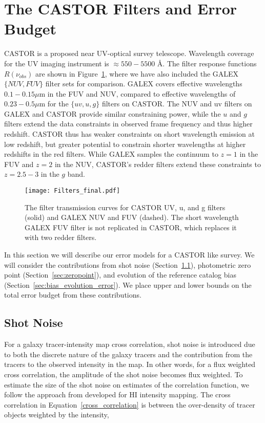 \documentclass[fleqn,usenatbib]{mnras}
\begin{document}
\section{The CASTOR Filters and Error Budget}
\label{sec:error}

{\small CASTOR} is a proposed near UV-optical survey telescope. Wavelength coverage for the UV imaging instrument is $\approx 550-5500$ \AA. The filter response functions  $R(\nu_{obs})$ are shown in Figure~\ref{fig:filter_curves}, where we have also included the {\small GALEX} $\{NUV, FUV\}$ filter sets for comparison. {\small GALEX} covers effective wavelengths $0.1-0.15 \mu$m in the FUV and NUV, compared to effective wavelengths of $0.23-0.5 \mu$m for the $\{uv, u, g\}$ filters on {\small CASTOR}. The NUV and uv filters on {\small GALEX} and {\small CASTOR} provide similar constraining power, while the $u$ and $g$ filters extend the data constraints in observed frame frequency and thus higher redshift. {\small CASTOR} thus has weaker constraints on short wavelength emission at low redshift, but greater potential to constrain shorter wavelengths at higher redshifts in the red filters. While GALEX samples the continuum to $z = 1$ in the FUV and $z=2$ in the NUV, {\small CASTOR}'s redder filters extend these constraints to $z=2.5-3$ in the $g$ band. 
 
\begin{figure}
\texttt{[image: Filters\_final.pdf]}
\caption{\label{fig:filter_curves} The filter transmission curves for {\small CASTOR} UV, u, and g filters (solid) and {\small GALEX} NUV and FUV (dashed). The short wavelength {\small GALEX} FUV filter is not replicated in {\small CASTOR}, which replaces it with two redder filters.}
\end{figure}

In this section we will describe our error models for a {\small CASTOR} like survey. We will consider the contributions from shot noise (Section~\ref{sec:shotnoise}),  photometric zero point (Section~\ref{sec:zeropoint}), and evolution of the reference catalog bias (Section~\ref{sec:bias_evolution_error}). We place upper and lower bounds on the total error budget from these contributions. 


\subsection{Shot Noise} 
\label{sec:shotnoise}

For a galaxy tracer-intensity map cross correlation, shot noise is introduced due to both the discrete nature of the galaxy tracers and the contribution from the tracers to the observed intensity in the map. In other words, for a flux weighted cross correlation, the amplitude of the shot noise becomes flux weighted. To estimate the size of the shot noise on estimates of the correlation function, we follow the approach from \citet{Wolz_2017} developed for HI intensity mapping. The cross correlation in Equation~\ref{cross_correlation} is between the over-density of tracer objects weighted by the intensity, 
\end{document}
